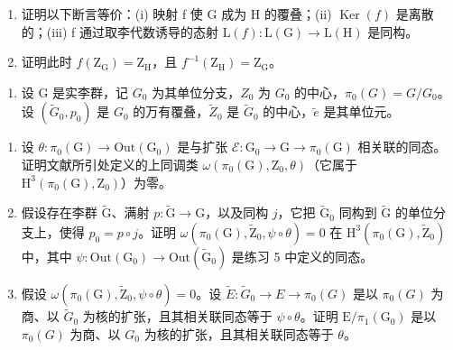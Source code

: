 \begin{enumerate}
\def\labelenumi{\alph{enumi})}
\item
  证明以下断言等价：(i) 映射 f 使 G 成为 H 的覆叠；(ii) \(\operatorname{Ker}(f)\) 是离散的；(iii) f 通过取李代数诱导的态射 \(\mathrm{L}(f)\colon\mathrm{L}(\mathrm{G})\to\mathrm{L}(\mathrm{H})\) 是同构。
\item
  证明此时 \(f(\mathrm{Z}_{\mathrm{G}})=\mathrm{Z}_{\mathrm{H}}\)，且 \(f^{-1}(\mathrm{Z}_{\mathrm{H}})=\mathrm{Z}_{\mathrm{G}}\)。
\end{enumerate}

\begin{enumerate}
\def\labelenumi{\arabic{enumi})}
\setcounter{enumi}{6}
\tightlist
\item
  设 G 是实李群，记 \(G_{0}\) 为其单位分支，\(Z_{0}\) 为 \(G_{0}\) 的中心，\(\pi_{0}(G)=G/G_{0}\)。设 \((\widetilde{G}_{0},p_{0})\) 是 \(G_{0}\) 的万有覆叠，\(\widetilde{Z}_{0}\) 是 \(\widetilde{G}_{0}\) 的中心，\(\widetilde{e}\) 是其单位元。
\end{enumerate}

\begin{enumerate}
\def\labelenumi{\alph{enumi})}
\item
  设 \(\theta\colon\pi_{0}(\mathrm{G})\to\mathrm{Out}(\mathrm{G}_{0})\) 是与扩张 \(\mathcal{E}\colon\mathrm{G}_{0}\to\mathrm{G}\to\pi_{0}(\mathrm{G})\) 相关联的同态。证明文献所引处定义的上同调类 \(\omega(\pi_{0}(\mathrm{G}),\mathrm{Z}_{0},\theta)\)（它属于 \(\mathrm{H}^{3}(\pi_{0}(\mathrm{G}),\mathrm{Z}_{0})\)）为零。
\item
  假设存在李群 \(\widetilde{\mathrm{G}}\)、满射 \(p\colon\widetilde{\mathrm{G}}\to\mathrm{G}\)，以及同构 \(j\)，它把 \(\widetilde{\mathrm{G}}_{0}\) 同构到 \(\widetilde{\mathrm{G}}\) 的单位分支上，使得 \(p_{0}=p\circ j\)。证明 \(\omega(\pi_{0}(\mathrm{G}),\widetilde{\mathrm{Z}}_{0},\psi\circ\theta)=0\) 在 \(\mathrm{H}^{3}(\pi_{0}(\mathrm{G}),\widetilde{\mathrm{Z}}_{0})\) 中，其中 \(\psi\colon\mathrm{Out}(\mathrm{G}_{0})\to\mathrm{Out}(\widetilde{\mathrm{G}}_{0})\) 是练习 5 中定义的同态。
\item
  假设 \(\omega(\pi_{0}(\mathrm{G}),\widetilde{\mathrm{Z}}_{0},\psi\circ\theta)=0\)。设 \(\widetilde{E}\colon\widetilde{G}_{0}\to E\to\pi_{0}(G)\) 是以 \(\pi_{0}(G)\) 为商、以 \(\widetilde{G}_{0}\) 为核的扩张，且其相关联同态等于 \(\psi\circ\theta\)。证明 \(\mathrm{E}/\pi_{1}(\mathrm{G}_{0})\) 是以 \(\pi_{0}(G)\) 为商、以 \(G_{0}\) 为核的扩张，且其相关联同态等于 \(\theta\)。
\end{enumerate}


